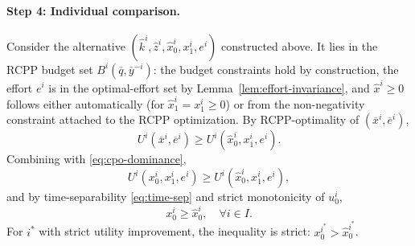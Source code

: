 \documentclass[11pt,a4paper,oneside]{book}
\def\geq{\geqslant}
\theoremstyle{plain}
\theoremstyle{definition}
\theoremstyle{remark}
\numberwithin{equation}{chapter}
\begin{document}
\paragraph{Step 4: Individual comparison.}
Consider the alternative $(\widehat{k}^i, \widehat{z}^i, \widehat{x}^i_0, x^i_1, e^i)$ constructed above.
It lies in the RCPP budget set $B^i(\overline{q}, \overline{y}^{-i})$: the budget constraints hold by construction, the effort $e^i$ is in the optimal-effort set by Lemma~\ref{lem:effort-invariance}, and $\widehat{x}^i \geq 0$ follows either automatically (for $\widehat{x}^i_1 = x^i_1 \geq 0$) or from the non-negativity constraint attached to the RCPP optimization.
By RCPP-optimality of $(\overline{x}^i, \overline{e}^i)$,
\begin{equation*}
  U^i(\overline{x}^i, \overline{e}^i) \geq U^i(\widehat{x}^i_0, x^i_1, e^i).
\end{equation*}
Combining with \eqref{eq:cpo-dominance},
\begin{equation*}
  U^i(x^i_0, x^i_1, e^i) \geq U^i(\widehat{x}^i_0, x^i_1, e^i),
\end{equation*}
and by time-separability \eqref{eq:time-sep} and strict monotonicity of $u^i_0$,
\begin{equation}\label{eq:x0-inequality}
  x^i_0 \geq \widehat{x}^i_0, \quad \forall i \in I.
\end{equation}
For $i^\ast$ with strict utility improvement, the inequality is strict: $x^{i^\ast}_0 > \widehat{x}^{i^\ast}_0$.
\end{document}

